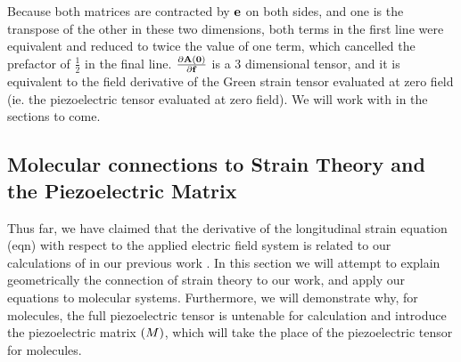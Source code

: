 Because both matrices are contracted by ${\mathbf e}$ on both sides, and one is the transpose of the other in these two dimensions, both terms in the first line were equivalent and reduced to twice
the value of one term, which cancelled the prefactor of $\frac{1}{2}$ in the final line.
$\frac{\partial {\mathbf A}({\mathbf 0})}{\partial {\mathbf f}}$ is a 3 dimensional tensor, and it is equivalent to the field derivative of the Green strain tensor evaluated at zero field (ie. the piezoelectric tensor evaluated
at zero field).  
We will work with  in the sections to come.  

\subsection{Molecular connections to Strain Theory and the Piezoelectric Matrix}

Thus far, we have claimed that the derivative of the longitudinal strain equation (eqn) with respect to the applied electric field system
is related to our calculations of \dtt in our previous work \cite{Werling0,Werling1}.  
In this section we will attempt to explain geometrically the connection of strain theory to our work, and apply our equations to molecular 
systems.
Furthermore, we will demonstrate why, for molecules, the full piezoelectric tensor is untenable for calculation and introduce the piezoelectric 
matrix ${\mathbf (}M)$, which will take the place
of the piezoelectric tensor for molecules.  

